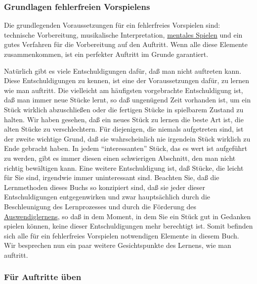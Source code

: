 \subsubsection{Grundlagen fehlerfreien Vorspielens}
\label{c1iii14b}

Die grundlegenden Voraussetzungen für ein fehlerfreies Vorspielen sind: technische Vorbereitung, musikalische Interpretation, \hyperref[c1ii12mental]{mentales Spielen} und ein gutes Verfahren für die Vorbereitung auf den Auftritt.
Wenn alle diese Elemente zusammenkommen, ist ein perfekter Auftritt im Grunde garantiert.

Natürlich gibt es viele Entschuldigungen dafür, daß man nicht auftreten kann.
Diese Entschuldigungen zu kennen, ist eine der Voraussetzungen dafür, zu lernen wie man auftritt.
Die vielleicht am häufigsten vorgebrachte Entschuldigung ist, daß man immer neue Stücke lernt, so daß ungenügend Zeit vorhanden ist, um ein Stück wirklich abzuschließen oder die fertigen Stücke in spielbarem Zustand zu halten.
Wir haben gesehen, daß ein neues Stück zu lernen die beste Art ist, die alten Stücke zu verschlechtern.
Für diejenigen, die niemals aufgetreten sind, ist der zweite wichtige Grund, daß sie wahrscheinlich nie irgendein Stück wirklich zu Ende gebracht haben.
In jedem \enquote{interessanten} Stück, das es wert ist aufgeführt zu werden, gibt es immer diesen einen schwierigen Abschnitt, den man nicht richtig bewältigen kann.
Eine weitere Entschuldigung ist, daß Stücke, die leicht für Sie sind, irgendwie immer uninteressant sind.
Beachten Sie, daß die Lernmethoden dieses Buchs so konzipiert sind, daß sie jeder dieser Entschuldigungen entgegenwirken und zwar hauptsächlich durch die Beschleunigung des Lernprozesses und durch die Förderung des \hyperref[c1iii6]{Auswendiglernens},
so daß in dem Moment, in dem Sie ein Stück gut in Gedanken spielen können, keine dieser Entschuldigungen mehr berechtigt ist.
Somit befinden sich alle für ein fehlerfreies Vorspielen notwendigen Elemente in diesem Buch.
Wir besprechen nun ein paar weitere Gesichtspunkte des Lernens, wie man auftritt.


\subsubsection{Für Auftritte üben}
\label{c1iii14c}

